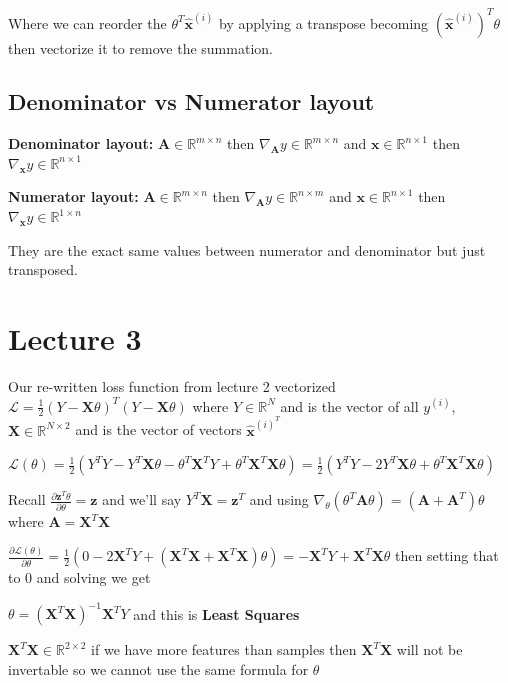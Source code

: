 \documentclass[twocolumn, letter, 10pt, landscape]{article}
\newcommand{\mb}{\mathbf}
\begin{document}
Where we can reorder the $\theta^T\hat{\mathbf{x}}^{(i)}$ by applying a transpose becoming $(\hat{\mathbf{x}}^{(i)})^T\theta$ then vectorize it to remove the summation.

\subsection{Denominator vs Numerator layout}
\textbf{Denominator layout:} $\mathbf{A}\in \mathbb{R}^{m\times n}$ then $\nabla_{\mathbf{A}}y \in \mathbb{R}^{m\times n}$ and $\mathbf{x}\in \mathbb{R}^{n\times 1}$ then $\nabla_{\mathbf{x}}y \in \mathbb{R}^{n\times 1}$

\textbf{Numerator layout:} $\mathbf{A}\in \mathbb{R}^{m\times n}$ then $\nabla_{\mathbf{A}}y \in \mathbb{R}^{n\times m}$ and $\mathbf{x}\in \mathbb{R}^{n\times 1}$ then $\nabla_{\mathbf{x}}y \in \mathbb{R}^{1\times n}$

They are the exact same values between numerator and denominator but just transposed.

\section{Lecture 3}
Our re-written loss function from lecture 2 vectorized $\mathcal{L}=\frac{1}{2}(Y-\mathbf{X}\theta)^T(Y-\mathbf{X}\theta)$ where $Y \in \mathbb{R}^N$ and is the vector of all $y^{(i)}$, $\mathbf{X}\in \mathbb{R}^{N\times 2}$ and is the vector of vectors $\hat{\mathbf{x}}^{(i)^T}$

$\mathcal{L}(\theta)=\frac{1}{2}(Y^TY-Y^T\mathbf{X}\theta - \theta^T\mathbf{X}^TY + \theta^T\mathbf{X}^T\mathbf{X}\theta) = \frac{1}{2}(Y^TY-2Y^T\mathbf{X}\theta + \theta^T\mathbf{X}^T\mathbf{X}\theta)$

Recall $\frac{\partial \mathbf{z}^T\theta}{\partial\theta} = \mathbf{z}$ and we'll say $Y^T\mathbf{X} = \mathbf{z}^T$ and using $\nabla_\theta(\theta^T \mathbf{A}\theta) =(\mathbf{A} + \mathbf{A}^T)\theta$ where $\mathbf{A} = \mathbf{X}^T\mathbf{X}$

$\frac{\partial\mathcal{L}(\theta)}{\partial\theta} = \frac{1}{2}(0-2\mathbf{X}^TY + (\mathbf{X}^T\mathbf{X}+\mathbf{X}^T\mathbf{X})\theta) = -\mathbf{X}^TY + \mathbf{X}^T\mathbf{X}\theta$ then setting that to 0 and solving we get

$\theta = (\mb{X}^T\mathbf{X})^{-1}\mathbf{X}^TY$ and this is \textbf{Least Squares}

$\mb{X}^T\mb{X}\in \mathbb{R}^{2\times 2}$ if we have more features than samples then $\mb{X}^T\mb{X}$ will not be invertable so we cannot use the same formula for $\theta$
\end{document}
